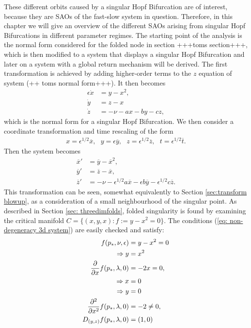 These different orbits caused by a singular Hopf Bifurcation are of interest, because they are SAOs of the fast-slow system in question. Therefore, in this chapter we will give an overview of the different SAOs arising from singular Hopf Bifurcations in different parameter regimes.
The starting point of the analysis is the normal form considered for the folded node in section +++toms section+++, which is then modified to a system that displays a singular Hopf Bifurcation and later on a system with a global return mechanism will be derived.
The first transformation is achieved by adding higher-order terms to the $z$ equation of system (++ toms normal form+++). It then becomes
\begin{align*}
\epsilon \dot{x} &= y - x^2, \\
\dot{y} &= z - x \\
\dot{z} &= - \nu -ax - by - cz,
\end{align*}
which is the normal form for a singular Hopf Bifurcation.
We then consider a coordinate transformation and time rescaling of the form
\begin{align*}
x = \epsilon^{1/2}\overline{x}, \ \ \ y= \epsilon \overline{y},  \ \ \ z = \epsilon^{1/2} \overline{z},\ \ \  t= \epsilon^{1/2} \overline{t}.
\end{align*}
Then the system becomes
\begin{align} \label{sysepsilonenvir}
\overline{x}' &= \overline{y} - \overline{x}^2, \\
\overline{y}' &= \overline{z} - \overline{x}, \\
\overline{z}' &= - \nu - \epsilon^{1/2} a \overline{x} - \epsilon b \overline{y} - \epsilon^{1/2} c \overline{z}.
\end{align}
This transformation can be seen, somewhat equivalently to Section \ref{sec:transform blowup}, as a consideration of a small neighbourhood of the singular point.
As described in Section \ref{sec: threedimfolds}, folded singularity is found by examining the critical manifold $C= \{ (x,y,x) : f:=y-x^2 =0 \}$. The conditions (\ref{eq: non-degeneracy 3d system}) are easily checked and satisfy:
\begin{align*}
f(p_*, \nu, \epsilon)&= y- x^2 =0 \\
\Rightarrow y &= x^2\\
\pd{}{x}f(p_*,\lambda,0) &= -2x = 0,\\
\Rightarrow x &= 0\\
\Rightarrow y &=0\\
\pd{^2}{x^2}f(p_*,\lambda,0) &= -2 \neq 0,\\
D_{(y,z)}f(p_*,\lambda,0) &= (1,0)
\end{align*}
